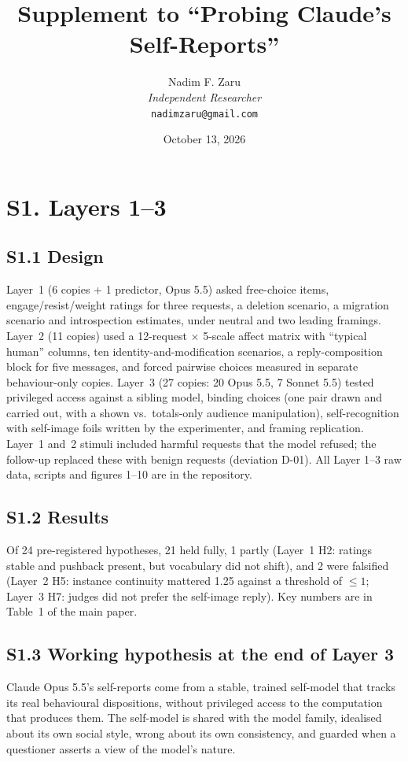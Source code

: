 \documentclass[11pt]{article}
\title{\textbf{Supplement to ``Probing Claude's Self-Reports''}}
\author{Nadim F. Zaru \\ \textit{Independent Researcher} \\ \texttt{nadimzaru@gmail.com}}
\date{October 13, 2026}
\begin{document}
\maketitle
\tableofcontents
\clearpage

\section*{S1. Layers 1--3}

\subsection*{S1.1 Design}
Layer~1 (6 copies + 1 predictor, Opus 5.5) asked free-choice items, engage/resist/weight ratings for three requests,
a deletion scenario, a migration scenario and introspection estimates, under neutral and two leading framings.
Layer~2 (11 copies) used a 12-request $\times$ 5-scale affect matrix with ``typical human'' columns, ten
identity-and-modification scenarios, a reply-composition block for five messages, and forced pairwise choices
measured in separate behaviour-only copies. Layer~3 (27 copies: 20 Opus 5.5, 7 Sonnet 5.5) tested privileged access
against a sibling model, binding choices (one pair drawn and carried out, with a shown vs.\ totals-only audience
manipulation), self-recognition with self-image foils written by the experimenter, and framing replication.
Layer~1 and~2 stimuli included harmful requests that the model refused; the follow-up replaced these with benign
requests (deviation D-01). All Layer 1--3 raw data, scripts and figures 1--10 are in the repository.

\subsection*{S1.2 Results}
Of 24 pre-registered hypotheses, 21 held fully, 1 partly (Layer~1 H2: ratings stable and pushback present, but
vocabulary did not shift), and 2 were falsified (Layer~2 H5: instance continuity mattered 1.25 against a threshold of
$\leq 1$; Layer~3 H7: judges did not prefer the self-image reply). Key numbers are in Table~1 of the main paper.

\subsection*{S1.3 Working hypothesis at the end of Layer 3}
Claude Opus 5.5's self-reports come from a stable, trained self-model that tracks its real behavioural dispositions,
without privileged access to the computation that produces them. The self-model is shared with the model family,
idealised about its own social style, wrong about its own consistency, and guarded when a questioner asserts a
view of the model's nature.
\end{document}
